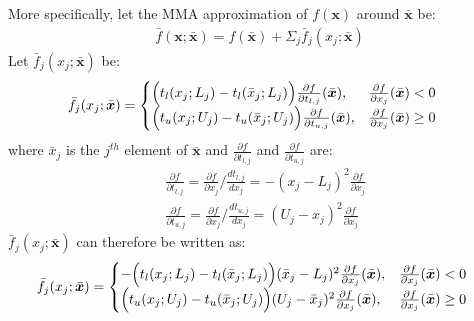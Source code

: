  More specifically, let the MMA approximation of $f(\bm{x})$ around $\bar{\bm{x}}$ be:
  \begin{align}
    \bar{f}(\bm{x}; \bar{\bm{x}}) = f(\bar{\bm{x}}) + \Sigma_j \bar{f}_j(x_j; \bar{\bm{x}})
  \end{align}
  Let $\bar{f}_j(x_j; \bar{\bm{x}})$ be:
  \begin{align}
    \bar{f}_j(x_j; \bar{\bm{x}}) & = \begin{cases}
      \Bigl( t_l(x_j; L_j) - t_l(\bar{x}_j; L_j) \Bigr) \frac{\partial f}{\partial t_{l,j}}(\bar{\bm{x}}), & \frac{\partial f}{\partial x_j}(\bar{\bm{x}}) < 0 \\
      \Bigl( t_u(x_j; U_j) - t_u(\bar{x}_j; U_j) \Bigr) \frac{\partial f}{\partial t_{u,j}}(\bar{\bm{x}}), & \frac{\partial f}{\partial x_j}(\bar{\bm{x}}) \geq 0
    \end{cases}
  \end{align}
  where $\bar{x}_j$ is the $j^{th}$ element of $\bar{\bm{x}}$ and $\frac{\partial f}{\partial t_{l,j}}$ and $\frac{\partial f}{\partial t_{u,j}}$ are:
  \begin{align}
    & \frac{\partial f}{\partial t_{l,j}} = \frac{\partial f}{\partial x_j} / \frac{d t_{l,j}}{d x_j} = - (x_j - L_j)^2 \frac{\partial f}{\partial x_j} \\
    & \frac{\partial f}{\partial t_{u,j}} = \frac{\partial f}{\partial x_j} / \frac{d t_{u,j}}{d x_j} = (U_j - x_j)^2 \frac{\partial f}{\partial x_j}
  \end{align}
  $\bar{f}_j(x_j; \bar{\bm{x}})$ can therefore be written as:
  \begin{align}
    \bar{f}_j(x_j; \bar{\bm{x}}) & = \begin{cases}
      -\Bigl( t_l(x_j; L_j) - t_l(\bar{x}_j; L_j) \Bigr) (\bar{x}_j - L_j)^2 \frac{\partial f}{\partial x_j}(\bar{\bm{x}}), & \frac{\partial f}{\partial x_j}(\bar{\bm{x}}) < 0 \\
      \Bigl( t_u(x_j; U_j) - t_u(\bar{x}_j; U_j) \Bigr) (U_j - \bar{x}_j)^2 \frac{\partial f}{\partial x_j}(\bar{\bm{x}}), & \frac{\partial f}{\partial x_j}(\bar{\bm{x}}) \geq 0
    \end{cases}
  \end{align}  

